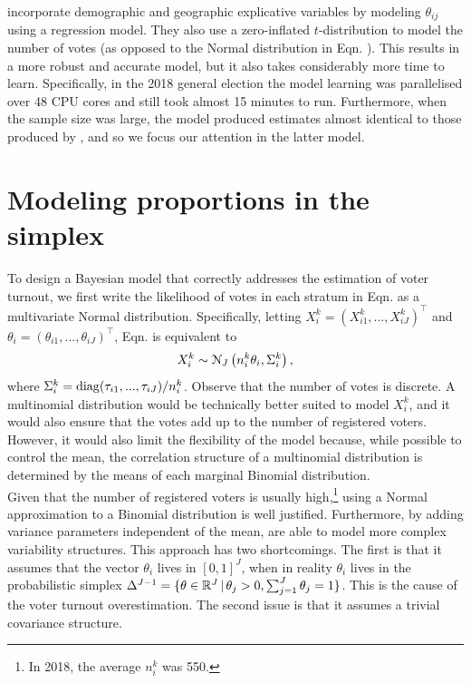 \documentclass{article}
\begin{document}
\cite{anzarut2018} incorporate demographic and geographic explicative variables by modeling $\theta_{ij}$ using a regression model. They also use a zero-inflated $t$-distribution to model the number of votes (as opposed to the Normal distribution in Eqn. ). This results in a more robust and accurate model, but it also takes considerably more time to learn. Specifically, in the 2018 general election the model learning was parallelised over 48 CPU cores and still took almost 15 minutes to run. Furthermore, when the sample size was large, the model produced estimates almost identical to those produced by \cite{diluvi2018}, and so we focus our attention in the latter model.



\section{Modeling proportions in the simplex} \label{sec:model}


To design a Bayesian model that correctly addresses the estimation of voter turnout, we first write the likelihood of votes in each stratum in Eqn.  as a multivariate Normal distribution. Specifically, letting $X_i^k = (X_{i1}^k,..., X_{iJ}^k)^\top$ and $\theta_i = (\theta_{i1}, ..., \theta_{iJ})^\top$, Eqn.  is equivalent to
\[
  X_i^k \sim \mathcal{N}_J \left( n_i^k \theta_i, \Sigma_i^k \right),
\]
where $\Sigma_i^k = \operatorname{diag}(\tau_{i1}, ..., \tau_{iJ}) / n_i^k$. Observe that the number of votes is discrete. A multinomial distribution would be technically better suited to model $X_i^k$, and it would also ensure that the votes add up to the number of registered voters. However, it would also limit the flexibility of the model because, while possible to control the mean, the correlation structure of a multinomial distribution is determined by the means of each marginal Binomial distribution.
\\


Given that the number of registered voters is usually high,\footnote{In 2018, the average $n_i^k$ was 550.} using a Normal approximation to a Binomial distribution is well justified. Furthermore, by adding variance parameters independent of the mean, \citet{mendoza-nieto2016, diluvi2018} are able to model more complex variability structures. This approach has two shortcomings. The first is that it assumes that the vector $\theta_i$ lives in $[0, 1]^J$, when in reality $\theta_i$ lives in the probabilistic simplex $\Delta^{J-1} = \{ \theta \in \mathbb{R}^J \,|\, \theta_j > 0, \sum_{j=1}^J \theta_j = 1 \}$. This is the cause of the voter turnout overestimation. The second issue is that it assumes a trivial covariance structure.
\\
\end{document}
